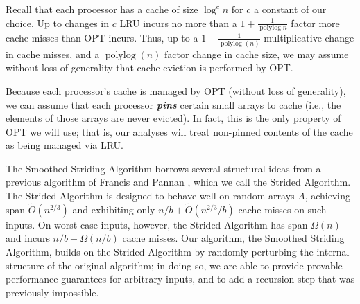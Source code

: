 \documentclass[sigplan, 10pt, nonacm]{acmart}
\newcommand{\polylog}{\operatorname{polylog}}
\newcommand{\defn}[1]{{\textit{\textbf{\boldmath #1}}}}
\renewcommand{\paragraph}[1]{\vspace{0.09in}\noindent{\bf \boldmath #1.}}
\theoremstyle{remark}
\theoremstyle{remark}
\begin{document}
Recall that each processor has a cache of size $\log^c n$ for $c$ a
constant of our choice.  Up to changes in $c$ LRU incurs no more than
a $1+\frac{1}{\operatorname{polylog}{n}}$ factor more cache misses
than OPT incurs. Thus, up to a $1 + \frac{1}{\polylog(n)}$
multiplicative change in cache misses, and a $\polylog(n)$ factor change in
cache size, we may assume without loss of generality that cache
eviction is performed by OPT.

Because each processor's cache is managed by OPT (without loss of
generality), we can assume that each processor \defn{pins} certain
small arrays to cache (i.e., the elements of those arrays are never
evicted). In fact, this is the only property of OPT we will use; that
is, our analyses will treat non-pinned contents of the cache as being
managed via LRU.

\paragraph{The Strided Algorithm \cite{FrancisPa92}}
The Smoothed Striding Algorithm borrows several structural ideas from a previous algorithm of Francis and Pannan \cite{FrancisPa92}, which we call the Strided Algorithm. The Strided Algorithm is designed to behave well on random arrays $A$, achieving span $\tilde{O}(n^{2/3})$ and exhibiting only $n/b + \tilde{O}(n^{2/3} / b)$  cache misses on such inputs. On worst-case inputs, however, the Strided Algorithm has span $\Omega(n)$ and incurs $n/b + \Omega(n/b)$ cache misses. Our algorithm, the Smoothed Striding Algorithm, builds on the Strided Algorithm by randomly perturbing the internal structure of the original algorithm; in doing so, we are able to provide provable performance guarantees for arbitrary inputs, and to add a recursion step that was previously impossible.
\end{document}
